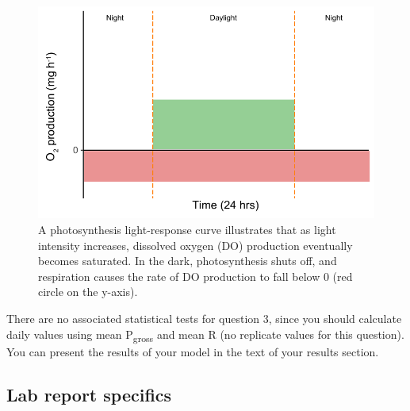 \documentclass[11pt,]{article}
\begin{document}
\begin{figure}
\centering
\includegraphics{../_chapter_materials/photo_model.pdf}
\caption{A photosynthesis light-response curve illustrates that as light
intensity increases, dissolved oxygen (DO) production eventually becomes
saturated. In the dark, photosynthesis shuts off, and respiration causes
the rate of DO production to fall below 0 (red circle on the y-axis).}
\end{figure}

There are no associated statistical tests for question 3, since you
should calculate daily values using mean P\textsubscript{gross} and mean
R (no replicate values for this question). You can present the results
of your model in the text of your results section.

\pagebreak

\hypertarget{lab-report-specifics}{%
\subsection{Lab report specifics}\label{lab-report-specifics}}
\end{document}
